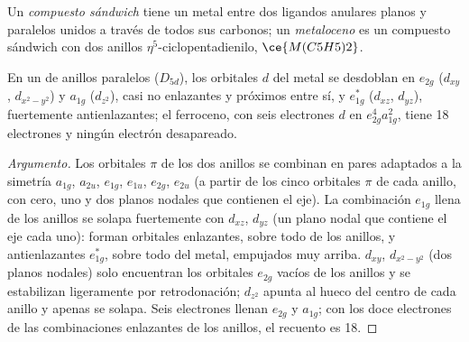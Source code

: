 \begin{definition}[Metalocenos]\label{def:b3:organometallic-bonding:metallocene}
Un \emph{compuesto sándwich} tiene un metal entre dos
ligandos anulares planos y paralelos unidos a través de todos sus carbonos; un
\emph{metaloceno} es un compuesto sándwich con dos anillos
$\eta^5$-ciclopentadienilo, $\ce{M(C5H5)2}$.
\end{definition}

\begin{proposition}\label{prop:b3:organometallic-bonding:ferrocene}
En un  de anillos paralelos ($D_{5d}$), los orbitales $d$ del metal se desdoblan en $e_{2g}$
($d_{xy}$, $d_{x^2-y^2}$) y $a_{1g}$ ($d_{z^2}$), casi no enlazantes y próximos entre sí, y $e_{1g}^\ast$ ($d_{xz}$,
$d_{yz}$), fuertemente antienlazantes; el ferroceno, con seis electrones $d$ en $e_{2g}^4a_{1g}^2$, tiene 18
electrones y ningún electrón desapareado.
\end{proposition}

\begin{proof}[Argumento]
Los orbitales $\pi$ de los dos anillos se combinan en pares adaptados a la simetría $a_{1g}$, $a_{2u}$,
$e_{1g}$, $e_{1u}$, $e_{2g}$, $e_{2u}$ (a partir de los cinco orbitales $\pi$ de cada anillo, con cero, uno y dos
planos nodales que contienen el eje). La combinación $e_{1g}$ llena de los anillos se solapa
fuertemente con $d_{xz}$, $d_{yz}$ (un plano nodal que contiene el eje cada uno): forman orbitales
enlazantes, sobre todo de los anillos, y antienlazantes $e_{1g}^\ast$, sobre todo del metal, empujados muy arriba. $d_{xy}$, $d_{x^2-y^2}$
(dos planos nodales) solo encuentran los orbitales $e_{2g}$ vacíos de los anillos y se estabilizan
ligeramente por retrodonación; $d_{z^2}$ apunta al hueco del centro de cada anillo y
apenas se solapa. Seis electrones llenan $e_{2g}$ y $a_{1g}$; con los doce electrones de las
combinaciones enlazantes de los anillos, el recuento es 18.
\end{proof}

